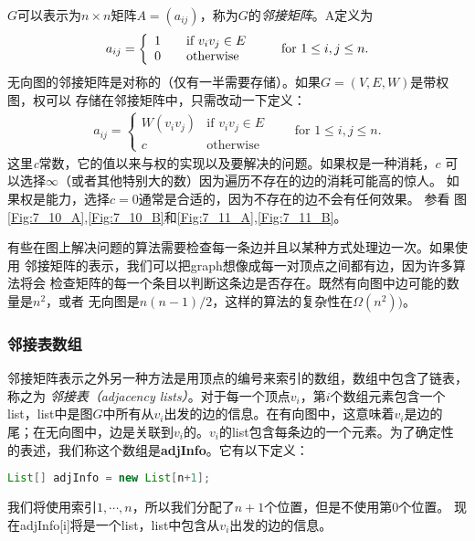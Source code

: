 $G$可以表示为$n\times n$矩阵$A=(a_{ij})$，称为$G$的\emph{邻接矩阵}。A定义为
\begin{displaymath}
a_{ij}=\left\{\begin{array}{l}
                   1 \qquad\mbox{if } v_iv_j \in E\\
                   \raggedleft 0 \qquad\mbox{otherwise}
                 \end{array}
\right.\qquad\mbox{for }1\leq i, j\leq n.
\end{displaymath}
无向图的邻接矩阵是对称的（仅有一半需要存储）。如果$G=(V,E,W)$是带权图，权可以
存储在邻接矩阵中，只需改动一下定义：
\begin{displaymath}
\begin{aligned}
a_{ij}=\left\{\begin{array}{ll}
                   W(v_iv_j) &\mbox{if } v_iv_j \in E\\
                   c &\mbox{otherwise}
                 \end{array}
\right.\qquad\mbox{for }1\leq i, j\leq n.
\end{aligned}
\end{displaymath}
这里\emph{c}常数，它的值以来与权的实现以及要解决的问题。如果权是一种消耗，$c$
可以选择$\infty$（或者其他特别大的数）因为遍历不存在的边的消耗可能高的惊人。
如果权是能力，选择$c=0$通常是合适的，因为不存在的边不会有任何效果。 参看
图\ref{Fig:7_10_A},\ref{Fig:7_10_B}和\ref{Fig:7_11_A},\ref{Fig:7_11_B}。

有些在图上解决问题的算法需要检查每一条边并且以某种方式处理边一次。如果使用
邻接矩阵的表示，我们可以把graph想像成每一对顶点之间都有边，因为许多算法将会
检查矩阵的每一个条目以判断这条边是否存在。既然有向图中边可能的数量是$n^2$，或者
无向图是$n(n-1)/2$，这样的算法的复杂性在$\Omega(n^2))$。

\subsubsection{邻接表数组}
邻接矩阵表示之外另一种方法是用顶点的编号来索引的数组，数组中包含了链表，称之为
\emph{邻接表（adjacency lists）}。对于每一个顶点$v_i$，第$i$个数组元素包含一个
list，list中是图$G$中所有从$v_i$出发的边的信息。在有向图中，这意味着$v_i$是边的
尾；在无向图中，边是关联到$v_i$的。$v_i$的list包含每条边的一个元素。为了确定性
的表述，我们称这个数组是{\textbf{adjInfo}}。它有以下定义：
\begin{lstlisting}[language={Java}, keywordstyle=\color{blue!70}, commentstyle=\color{red!50!green!50!blue!50}]
    List[] adjInfo = new List[n+1];
\end{lstlisting}
我们将使用索引$1,\cdots, n$，所以我们分配了$n+1$个位置，但是不使用第0个位置。
现在adjInfo[i]将是一个list，list中包含从$v_i$出发的边的信息。

